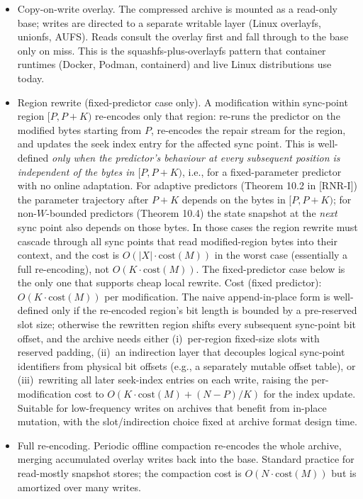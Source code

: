 \documentclass[
]{article}
\begin{document}
\begin{itemize}
\item
  Copy-on-write overlay. The compressed archive is mounted as a
  read-only base; writes are directed to a separate writable layer
  (Linux overlayfs, unionfs, AUFS). Reads consult the overlay first
  and fall through to the base only on miss. This is the
  squashfs-plus-overlayfs pattern that container runtimes (Docker,
  Podman, containerd) and live Linux distributions use today.
\item
  Region rewrite (fixed-predictor case only). A modification within
  sync-point region $[P, P + K)$ re-encodes only that region:
  re-runs the predictor on the modified bytes starting from $P$,
  re-encodes the repair stream for the region, and updates the seek
  index entry for the affected sync point. This is well-defined
  \emph{only when the predictor's behaviour at every subsequent
  position is independent of the bytes in $[P, P+K)$}, i.e., for a
  fixed-parameter predictor with no online adaptation. For adaptive
  predictors (Theorem 10.2 in [RNR-I]) the parameter trajectory after $P + K$
  depends on the bytes in $[P, P+K)$; for non-$W$-bounded
  predictors (Theorem 10.4) the state snapshot at the \emph{next}
  sync point also depends on those bytes. In those cases the
  region rewrite must cascade through all sync points that read
  modified-region bytes into their context, and the cost is
  $O(|X| \cdot \mathrm{cost}(M))$ in the worst case (essentially a
  full re-encoding), not $O(K \cdot \mathrm{cost}(M))$. The
  fixed-predictor case below is the only one that supports cheap
  local rewrite. Cost (fixed predictor): $O(K \cdot \mathrm{cost}(M))$
  per modification.
  The naive append-in-place form is well-defined only if the
  re-encoded region's bit length is bounded by a pre-reserved slot
  size; otherwise the rewritten region shifts every subsequent
  sync-point bit offset, and the archive needs either (i)~per-region
  fixed-size slots with reserved padding, (ii)~an indirection layer
  that decouples logical sync-point identifiers from physical bit
  offsets (e.g., a separately mutable offset table), or
  (iii)~rewriting all later seek-index entries on each write,
  raising the per-modification cost to
  $O(K \cdot \mathrm{cost}(M) + (N-P)/K)$ for the index update.
  Suitable for low-frequency writes on archives that benefit from
  in-place mutation, with the slot/indirection choice fixed at
  archive format design time.
\item
  Full re-encoding. Periodic offline compaction re-encodes the whole
  archive, merging accumulated overlay writes back into the base.
  Standard practice for read-mostly snapshot stores; the compaction
  cost is $O(N \cdot \mathrm{cost}(M))$ but is amortized over many
  writes.
\end{itemize}
\end{document}
